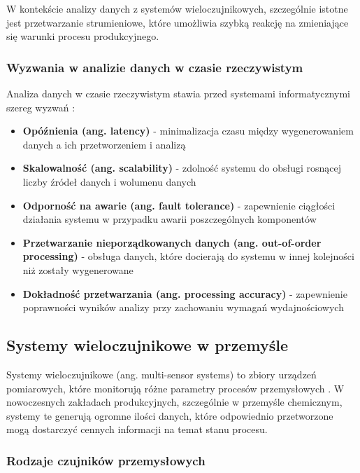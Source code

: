 W kontekście analizy danych z systemów wieloczujnikowych, szczególnie istotne jest przetwarzanie strumieniowe, które umożliwia szybką reakcję na zmieniające się warunki procesu produkcyjnego.

\subsubsection{Wyzwania w analizie danych w czasie rzeczywistym}
\label{subsubsec:wyzwania_analiza}

Analiza danych w czasie rzeczywistym stawia przed systemami informatycznymi szereg wyzwań \citep{realtime_challenges}:

\begin{itemize}
    \item \textbf{Opóźnienia (ang. latency)} - minimalizacja czasu między wygenerowaniem danych a ich przetworzeniem i analizą
    \item \textbf{Skalowalność (ang. scalability)} - zdolność systemu do obsługi rosnącej liczby źródeł danych i wolumenu danych
    \item \textbf{Odporność na awarie (ang. fault tolerance)} - zapewnienie ciągłości działania systemu w przypadku awarii poszczególnych komponentów
    \item \textbf{Przetwarzanie nieporządkowanych danych (ang. out-of-order processing)} - obsługa danych, które docierają do systemu w innej kolejności niż zostały wygenerowane
    \item \textbf{Dokładność przetwarzania (ang. processing accuracy)} - zapewnienie poprawności wyników analizy przy zachowaniu wymagań wydajnościowych
\end{itemize}

\subsection{Systemy wieloczujnikowe w przemyśle}
\label{subsec:systemy_wieloczujnikowe}

Systemy wieloczujnikowe (ang. multi-sensor systems) to zbiory urządzeń pomiarowych, które monitorują różne parametry procesów przemysłowych \citep{multisensor_systems}. W nowoczesnych zakładach produkcyjnych, szczególnie w przemyśle chemicznym, systemy te generują ogromne ilości danych, które odpowiednio przetworzone mogą dostarczyć cennych informacji na temat stanu procesu.

\subsubsection{Rodzaje czujników przemysłowych}
\label{subsubsec:rodzaje_czujnikow}

